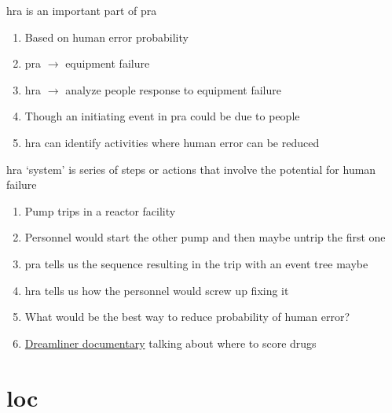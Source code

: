 \documentclass[aspectratio=1610,pdftex,dvipsnames,compress,xcolor={dvipsnames}]{beamer}
\newcommand{\acs}{\acrshort} %
\begin{document}
\addtocounter{framenumber}{-1}
\begin{frame}{\acs{hra} is an important part of \acs{pra}}
    \begin{enumerate}[series=outerlist,topsep=0pt,itemsep=21pt,leftmargin=*,label=(\arabic*)]
        \item[]Based on human error probability
        \item[]\acs{pra} $\rightarrow$ equipment failure
        \item[]\acs{hra} $\rightarrow$ analyze people response to equipment failure
        \item[]Though an initiating event in \acs{pra} could be due to people
        \item[]\acs{hra} can identify activities where human error can be reduced
    \end{enumerate}
\end{frame}


\begin{frame}{\acs{hra} `system' is series of steps or actions that involve the potential for human failure}
    \begin{enumerate}[series=outerlist,topsep=0pt,itemsep=18pt,leftmargin=*,label=(\arabic*)]
        \item[]Pump trips in a reactor facility
        \item[]Personnel would start the other pump and then maybe untrip the first one
        \item[]\acs{pra} tells us the sequence resulting in the trip with an event tree maybe
        \item[]\acs{hra} tells us how the personnel would screw up fixing it
        \item[]What would be the best way to reduce probability of human error?
        \item[]\href{https://uidaho.pressbooks.pub/riskassessment/chapter/contemporary-cases-in-risk-assessment-2/}{Dreamliner documentary} talking about where to score drugs
    \end{enumerate}
\end{frame}


\section{\acs{loc}}
\end{document}
